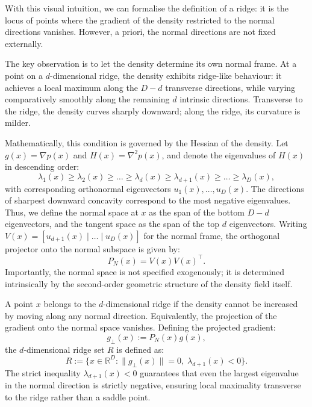 \documentclass{article}
\newcommand{\R}{\mathbb{R}}
\theoremstyle{plain}
\theoremstyle{definition}
\theoremstyle{remark}
\begin{document}
With this visual intuition, we can formalise the definition of a ridge: it is the locus of points where the gradient of the density restricted to the normal directions vanishes. However, a priori, the normal directions are not fixed externally.

The key observation is to let the density determine its own normal frame. At a point on a $d$-dimensional ridge, the density exhibits ridge-like behaviour: it achieves a local maximum along the $D-d$ transverse directions, while varying comparatively smoothly along the remaining $d$ intrinsic directions. Transverse to the ridge, the density curves sharply downward; along the ridge, its curvature is milder. 

Mathematically, this condition is governed by the Hessian of the density. Let $g(x) = \nabla p(x)$ and $H(x) = \nabla^2 p(x)$, and denote the eigenvalues of $H(x)$ in descending order:
\begin{equation}
    \lambda_1(x) \ge \lambda_2(x) \ge \dots \ge \lambda_d(x) \ge \lambda_{d+1}(x) \ge \dots \ge \lambda_D(x),
\end{equation}
with corresponding orthonormal eigenvectors $u_1(x), \dots, u_D(x)$. The directions of sharpest downward concavity correspond to the most negative eigenvalues. Thus, we define the normal space at $x$ as the span of the bottom $D-d$ eigenvectors, and the tangent space as the span of the top $d$ eigenvectors. Writing $V(x) = [u_{d+1}(x) \mid \dots \mid u_D(x)]$ for the normal frame, the orthogonal projector onto the normal subspace is given by:
\begin{equation}
    P_N(x) = V(x)V(x)^\top.
\end{equation}
Importantly, the normal space is not specified exogenously; it is determined intrinsically by the second-order geometric structure of the density field itself.

A point $x$ belongs to the $d$-dimensional ridge if the density cannot be increased by moving along any normal direction. Equivalently, the projection of the gradient onto the normal space vanishes. Defining the projected gradient:
\begin{equation}
    g_\perp(x) := P_N(x) g(x),
\end{equation}
the $d$-dimensional ridge set $R$ is defined as:
\begin{equation}
    R := \bigl\{ x \in \R^D : \|g_\perp(x)\| = 0, \; \lambda_{d+1}(x) < 0 \bigr\}.
\end{equation}
The strict inequality $\lambda_{d+1}(x) < 0$ guarantees that even the largest eigenvalue in the normal direction is strictly negative, ensuring local maximality transverse to the ridge rather than a saddle point. 
\end{document}
